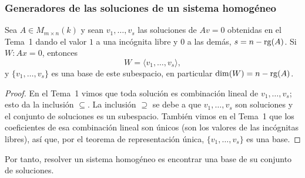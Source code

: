 \begin{frame}
    \frametitle{Generadores de las soluciones de un sistema homogéneo}

    \begin{proposition}
        Sea $A\in M_{m\times n}(k)$ y sean $v_1,\ldots,v_s$ las soluciones
        de $Av=0$ obtenidas en el Tema~1 dando el valor $1$ a una incógnita
        libre y $0$ a las demás, $s=n-\operatorname{rg}(A)$. Si $W\colon Ax=0$, entonces
        \[
            W=\langle v_1,\ldots,v_s\rangle,
        \]
        y $\{v_1,\ldots,v_s\}$ es una base de este subespacio, en particular
        $\dim(W)=n-\operatorname{rg}(A)$.
    \end{proposition}

    \vspace{-8pt}

    \begin{proof}
        En el Tema~1 vimos que toda solución es combinación lineal de
        $v_1,\ldots,v_s$; esto da la inclusión $\subseteq$. La inclusión
        $\supseteq$ se debe a que $v_1,\ldots,v_s$ son soluciones y el
        conjunto de soluciones es un subespacio. También vimos en el Tema~1
        que los coeficientes de esa combinación lineal son \alert{únicos}
        (son los valores de las incógnitas libres), así que, por el teorema
        de representación única, $\{v_1,\ldots,v_s\}$ es una base.
    \end{proof}

    \vspace{-5pt}

    Por tanto, resolver un sistema homogéneo es encontrar una
    \alert{base} de su conjunto de soluciones.
\end{frame}

